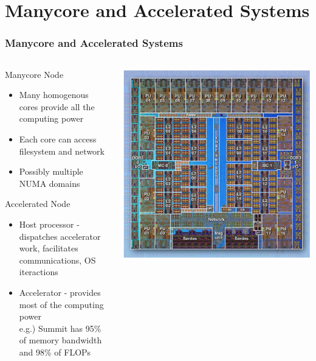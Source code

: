 \documentclass[aspectratio=169]{beamer}
\begin{document}
\section{Manycore and Accelerated Systems}
\begin{frame}
  \frametitle{Manycore and Accelerated Systems}
  \begin{columns}
    \begin{column}{0.7\textwidth}
      Manycore Node
      \begin{itemize}
        \item Many homogenous cores provide all the computing power
        \item Each core can access filesystem and network
        \item Possibly multiple NUMA domains
      \end{itemize}
      Accelerated Node
      \begin{itemize}
        \item Host processor - dispatches accelerator work, facilitates
          communications, OS iteractions
        \item Accelerator - provides most of the computing power \\
          e.g.) Summit has 95\% of memory bandwidth and 98\% of FLOPs
      \end{itemize}
    \end{column}
    \begin{column}{0.3\textwidth}
      \centering
      \includegraphics[width=.9\textwidth]{figures/A2processor.jpg}\\

\end{column}
\end{columns}
\end{frame}
\end{document}
